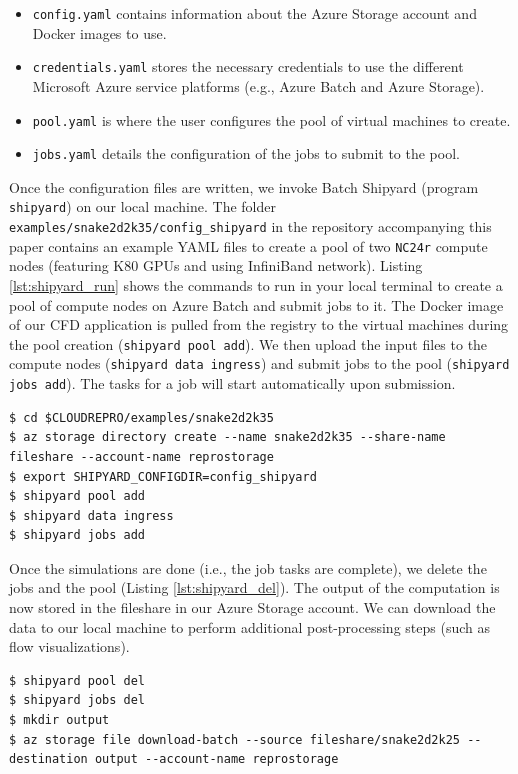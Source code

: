 \documentclass[10pt,journal,compsoc]{IEEEtran}
\begin{document}
\begin{itemize}
    \item \texttt{config.yaml} contains information about the Azure Storage account and Docker images to use.
    \item \texttt{credentials.yaml} stores the necessary credentials to use the different Microsoft Azure service platforms (e.g., Azure Batch and Azure Storage).
    \item \texttt{pool.yaml} is where the user configures the pool of virtual machines to create.
    \item \texttt{jobs.yaml} details the configuration of the jobs to submit to the pool.
\end{itemize}

Once the configuration files are written, we invoke Batch Shipyard (program \texttt{shipyard}) on our local machine.
The folder \texttt{examples/snake2d2k35/config\_shipyard} in the repository accompanying this paper contains an example YAML files to create a pool of two \texttt{NC24r} compute nodes (featuring K80 GPUs and using InfiniBand network).
Listing \ref{lst:shipyard_run} shows the commands to run in your local terminal to create a pool of compute nodes on Azure Batch and submit jobs to it.
The Docker image of our CFD application is pulled from the registry to the virtual machines during the pool creation (\texttt{shipyard pool add}).
We then upload the input files to the compute nodes (\texttt{shipyard data ingress}) and submit jobs to the pool (\texttt{shipyard jobs add}). The tasks for a job will start automatically upon submission.

\begin{lstlisting}[label=lst:shipyard_run,caption={Create a pool and submit jobs to it.}]
$ cd $CLOUDREPRO/examples/snake2d2k35
$ az storage directory create --name snake2d2k35 --share-name fileshare --account-name reprostorage
$ export SHIPYARD_CONFIGDIR=config_shipyard
$ shipyard pool add
$ shipyard data ingress
$ shipyard jobs add
\end{lstlisting}

Once the simulations are done (i.e., the job tasks are complete), we delete the jobs and the pool (Listing \ref{lst:shipyard_del}).
The output of the computation is now stored in the fileshare in our Azure Storage account.
We can download the data to our local machine to perform additional post-processing steps (such as flow visualizations).

\begin{lstlisting}[label=lst:shipyard_del,caption={Delete the pool and jobs, and download to output to a local machine.}]
$ shipyard pool del
$ shipyard jobs del
$ mkdir output
$ az storage file download-batch --source fileshare/snake2d2k25 --destination output --account-name reprostorage
\end{lstlisting}
\end{document}
